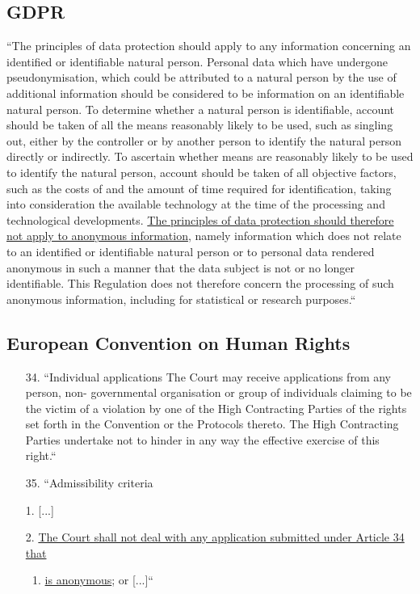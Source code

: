 \documentclass[aps,prb,twocolumn,superscriptaddress,floatfix,longbibliography,nofootinbib]{revtex4-2}
\begin{document}
  \subsection{\label{subsec:GDPR}GDPR}
  ``The principles of data protection should apply to any information concerning an
  identified or identifiable natural person. 
  Personal data which have undergone pseudonymisation, which could be attributed to a natural person by
  the use of additional information should be considered to be information on an identifiable natural person. To
  determine whether a natural person is identifiable, account should be taken of all the means reasonably likely to
  be used, such as singling out, either by the controller or by another person to identify the natural person directly
  or indirectly. To ascertain whether means are reasonably likely to be used to identify the natural person, account
  should be taken of all objective factors, such as the costs of and the amount of time required for identification,
  taking into consideration the available technology at the time of the processing and technological developments.
  \ul{The principles of data protection should therefore not apply to anonymous information}, namely information
  which does not relate to an identified or identifiable natural person or to personal data rendered anonymous in
  such a manner that the data subject is not or no longer identifiable. This Regulation does not therefore concern
  the processing of such anonymous information, including for statistical or research purposes.`` \cite{GDPR2016}

  \subsection{\label{subsec:ECHR}European Convention on Human Rights}
  \begin{enumerate}
    \item[34.] ``Individual applications
  The Court may receive applications from any person, non-
  governmental organisation or group of individuals claiming to be
  the victim of a violation by one of the High Contracting Parties of
  the rights set forth in the Convention or the Protocols thereto. The
  High Contracting Parties undertake not to hinder in any way the
  effective exercise of this right.``

\item[35.] ``Admissibility criteria
\end{enumerate}
  \begin{enumerate}
    \item[1.] [...]
    \item[2.] \ul{The Court shall not deal with any application submitted under Article 34 that}
    \begin{enumerate}
      \item \ul{is anonymous}; or [...]`` \cite{ECHR1950}
    \end{enumerate}
  \end{enumerate}
\end{document}
